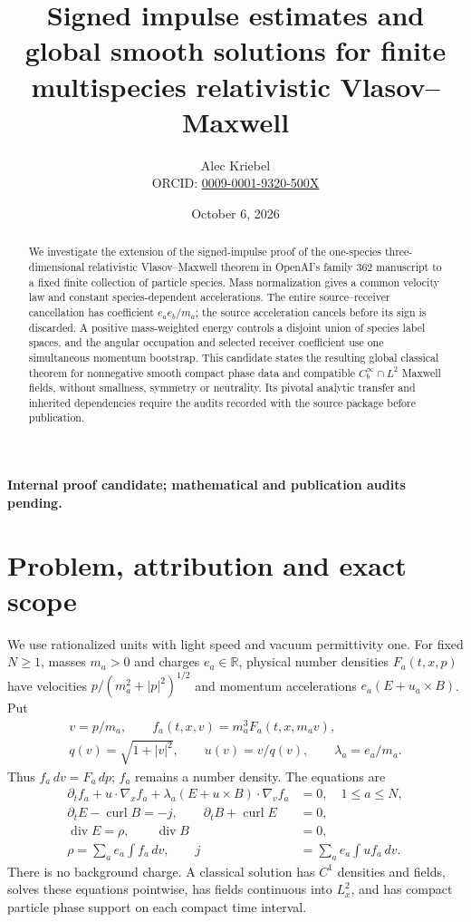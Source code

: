 \documentclass[11pt]{article}
\title{Signed impulse estimates and global smooth solutions for finite multispecies relativistic Vlasov--Maxwell}
\author{Alec Kriebel\\\small ORCID: \href{https://orcid.org/0009-0001-9320-500X}{0009-0001-9320-500X}}
\date{October 6, 2026}
\newcommand{\R}{\mathbb R}
\newcommand{\diver}{\operatorname{div}}
\newcommand{\curl}{\operatorname{curl}}
\theoremstyle{remark}\newtheorem{remark}[theorem]{Remark}
\numberwithin{equation}{section}
\begin{document}
\maketitle
\begin{center}\textbf{Internal proof candidate; mathematical and publication audits pending.}\end{center}
\begin{abstract}
We investigate the extension of the signed-impulse proof of the one-species
three-dimensional relativistic Vlasov--Maxwell theorem in OpenAI's family 362
manuscript to a fixed finite collection of particle species. Mass normalization
gives a common velocity law and constant species-dependent accelerations.
The entire source--receiver cancellation has coefficient $e_a e_b/m_a$;
the source acceleration cancels before its sign is discarded. A positive
mass-weighted energy controls a disjoint union of species label spaces,
and the angular occupation and selected receiver coefficient use one
simultaneous momentum bootstrap. This candidate states the resulting global
classical theorem for nonnegative smooth compact phase data and compatible
$C_b^\infty\cap L^2$ Maxwell fields, without smallness, symmetry or neutrality.
Its pivotal analytic transfer and inherited dependencies require the audits
recorded with the source package before publication.
\end{abstract}

\section{Problem, attribution and exact scope}
We use rationalized units with light speed and vacuum permittivity one.
For fixed $N\ge1$, masses $m_a>0$ and charges $e_a\in\R$, physical number
densities $F_a(t,x,p)$ have velocities
$p/(m_a^2+|p|^2)^{1/2}$ and momentum accelerations
$e_a(E+u_a\times B)$. Put
\begin{equation}\label{eq:normalization}
 \begin{gathered}
 v=p/m_a,\qquad f_a(t,x,v)=m_a^3F_a(t,x,m_av),\\
 q(v)=\sqrt{1+|v|^2},\qquad u(v)=v/q(v),\qquad\lambda_a=e_a/m_a.
 \end{gathered}
\end{equation}
Thus $f_a\,dv=F_a\,dp$; $f_a$ remains a number density. The equations are
\begin{equation}\label{eq:system}
\begin{aligned}
 \partial_t f_a+u\cdot\nabla_x f_a+
      \lambda_a(E+u\times B)\cdot\nabla_v f_a&=0,\quad 1\le a\le N,\\
 \partial_t E-\curl B=-j,\qquad \partial_t B+\curl E&=0,\\
 \diver E=\rho,\qquad\diver B&=0,\\
 \rho=\sum_a e_a\int f_a\,dv,\qquad j&=\sum_a e_a\int uf_a\,dv.
\end{aligned}
\end{equation}
There is no background charge. A classical solution has $C^1$ densities and
fields, solves these equations pointwise, has fields continuous into $L^2_x$,
and has compact particle phase support on each compact time interval.
\end{document}
